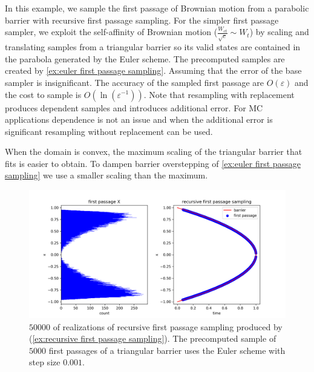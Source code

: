 \documentclass[a4paper,12pt]{article}
\begin{document}
\begin{example} \label{ex:recursive first passage sampling}
  In this example, we sample the first passage of Brownian motion from a parabolic barrier
  with recursive first passage sampling.
  For the simpler first passage sampler, we  exploit the self-affinity of Brownian motion
  ($\frac{W_{ct}}{\sqrt{c}} \sim W_{t}$)
  by scaling and translating
  samples from a triangular barrier so its
  valid states are contained in the parabola generated
  by the Euler scheme. The precomputed samples are created
  by \ref{ex:euler first passage sampling}.
  Assuming that the error of the base sampler is insignificant.
  The accuracy of the sampled first passage
  are $O(\varepsilon)$ and the cost to sample is $O(\ln \left(\varepsilon^{-1}\right))$.
  Note that resampling with replacement produces dependent samples and introduces additional error.
  For MC applications dependence is not an issue and when the additional error is significant resampling
  without replacement can be used.

  When the domain is convex, the maximum scaling of the triangular barrier that fits
  is easier to obtain.
  To dampen barrier
  overstepping of \ref{ex:euler first passage sampling} we use a smaller scaling
  than the maximum.

  \begin{figure}[h!]
    \centering
    \includegraphics[width=1\textwidth]{plots/recursive_first_passage_para.png}
    \caption{ $50000$ of realizations of recursive first passage sampling produced
      by (\ref{ex:recursive first passage sampling}). The precomputed sample of $5000$ first
      passages of a triangular barrier uses the Euler scheme with
      step size $0.001$.}
    \label{fig:recursive first passage para}
  \end{figure}

\end{example}
\end{document}
